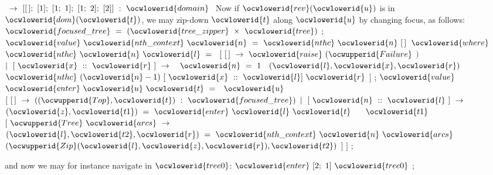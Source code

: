 \documentclass[12pt]{article}
\begin{document}
\ocwendcode{}\ocwindent{0.00em}
\ocwbegindcode{}~$\rightarrow{}~[[\,];~[1];~[1;~1];~[1;~2];~[2]]~:~\ocwlowerid{domain}~$\ocwenddcode{} 
\ocweol
\ocwindent{0.00em}
Now if \ocwbegindcode{}$\ocwlowerid{rev}(\ocwlowerid{u})$\ocwenddcode{} is in \ocwbegindcode{}$\ocwlowerid{dom}(\ocwlowerid{t})$\ocwenddcode{}, we may zip-down \ocwbegindcode{}$\ocwlowerid{t}$\ocwenddcode{} along \ocwbegindcode{}$\ocwlowerid{u}$\ocwenddcode{}
by changing focus, as follows: 
\ocweol
\label{../ML/zipper.ml:1814}%
\medskip
\ocwbegincode{}\ocwindent{0.00em}
~$\ocwlowerid{focused\_tree}~=~(\ocwlowerid{tree\_zipper}~\times{}~\ocwlowerid{tree})$\ocweol
\ocwindent{0.00em}
;\ocweol
\ocwindent{0.00em}
$\ocwlowerid{value}~\ocwlowerid{nth\_context}~\ocwlowerid{n}~=~\ocwlowerid{nthc}~\ocwlowerid{n}~[\,]$\ocweol
\ocwindent{0.50em}
$\ocwlowerid{where}~$~$\ocwlowerid{nthc}~\ocwlowerid{n}~\ocwlowerid{l}~=~$\ocweol
\ocwindent{1.50em}
$[~[\,]~\rightarrow{}~\ocwlowerid{raise}~(\ocwupperid{Failure}~$$)$\ocweol
\ocwindent{1.50em}
$\mid{}~[~\ocwlowerid{x}~::~\ocwlowerid{r}~]~\rightarrow{}~$~$\ocwlowerid{n}~=~1~$~$(\ocwlowerid{l},\ocwlowerid{x},\ocwlowerid{r})~$~$\ocwlowerid{nthc}~(\ocwlowerid{n}-1)~[~\ocwlowerid{x}~::~\ocwlowerid{l}]~\ocwlowerid{r}$\ocweol
\ocwindent{1.50em}
$]$\ocweol
\ocwindent{0.00em}
;\ocweol
\ocwindent{0.00em}
$\ocwlowerid{value}~$~$\ocwlowerid{enter}~\ocwlowerid{u}~\ocwlowerid{t}~=~$~$\ocwlowerid{u}~$\ocweol
\ocwindent{1.00em}
$[~[\,]~\rightarrow{}~((\ocwupperid{Top},\ocwlowerid{t})~:~\ocwlowerid{focused\_tree})$\ocweol
\ocwindent{1.00em}
$\mid{}~[~\ocwlowerid{n}~::~\ocwlowerid{l}~]~\rightarrow{}~$~$(\ocwlowerid{z},\ocwlowerid{t1})~=~\ocwlowerid{enter}~\ocwlowerid{l}~\ocwlowerid{t}~$\ocweol
\ocwindent{9.00em}
~~$\ocwlowerid{t1}~$~\ocweol
\ocwindent{2.00em}
$[~\ocwupperid{Tree}~\ocwlowerid{arcs}~\rightarrow{}~$~$(\ocwlowerid{l},\ocwlowerid{t2},\ocwlowerid{r})~=~\ocwlowerid{nth\_context}~\ocwlowerid{n}~\ocwlowerid{arcs}~$\ocweol
\ocwindent{9.50em}
~$(\ocwupperid{Zip}(\ocwlowerid{l},\ocwlowerid{z},\ocwlowerid{r}),\ocwlowerid{t2})$\ocweol
\ocwindent{2.00em}
$]$\ocweol
\ocwindent{1.00em}
$]$\ocweol
\ocwindent{0.00em}
;\medskip

\ocwendcode{}\ocwindent{0.00em}
and now we may for instance navigate in \ocwbegindcode{}$\ocwlowerid{tree0}$\ocwenddcode{}: 
\ocweol
\label{../ML/zipper.ml:2342}%
\medskip
\ocwbegincode{}\ocwindent{0.00em}
$\ocwlowerid{enter}~[2;~1]~\ocwlowerid{tree0}$\ocweol
\ocwindent{0.00em}
;\medskip
\end{document}
